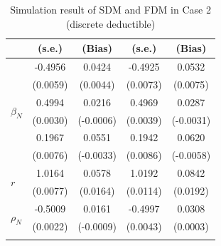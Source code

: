 \begin{table}[!ht]
{{\begin{minipage}{0.5\textwidth}
\begin{tabular}{lcccc}
        & (s.e.) & (Bias) & (s.e.) & (Bias) \\
        \midrule
        \multirow{6}{*}{$\beta_N$} & -0.4956 & 0.0424 & -0.4925 & 0.0532 \\
         & (0.0059) & (0.0044) & (0.0073) & (0.0075) \\
        \cmidrule{2-5}
         & 0.4994 & 0.0216 & 0.4969 & 0.0287 \\
         & (0.0030) & (-0.0006) & (0.0039) & (-0.0031) \\
        \cmidrule{2-5}
         & 0.1967 & 0.0551 & 0.1942 & 0.0620 \\
         & (0.0076) & (-0.0033) & (0.0086) & (-0.0058) \\
        \midrule
        \multirow{2}{*}{$r$} & 1.0164 & 0.0578 & 1.0192 & 0.0842 \\
         & (0.0077) & (0.0164) & (0.0114) & (0.0192) \\
        \midrule
        \multirow{2}{*}{$\rho_N$} & -0.5009 & 0.0161 & -0.4997 & 0.0308 \\
         & (0.0022) & (-0.0009) & (0.0043) & (0.0003) \\
        \hhline{=====}
        \end{tabular}
    \end{minipage}
}
}
\caption{Simulation result of SDM and FDM in Case 2 (discrete deductible)}\label{tab:AppSimEndCase2}
\end{table}

